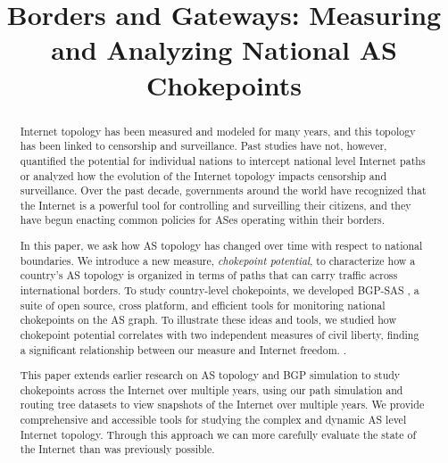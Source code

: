 \documentclass[10pt, conference, letterpaper]{IEEEtran}
\title{Borders and Gateways: Measuring and Analyzing National AS Chokepoints}
\newcommand{\toolname}{BGP-SAS }
\begin{document}
\maketitle

\begin{abstract}Internet topology has been measured and modeled for many years, and this topology has been linked to censorship and surveillance. Past studies have not, however, quantified the potential for individual nations to intercept national level Internet paths or analyzed how the evolution of the Internet topology impacts censorship and surveillance. Over the past decade, governments around the world have recognized that the Internet is a powerful tool for controlling and surveilling their citizens, and they have begun enacting common policies for ASes operating within their borders.

  In this paper, we ask how AS topology has changed over time with respect to national boundaries.  We introduce a new measure, \emph{chokepoint potential}, to characterize how a country's AS topology is organized in terms of paths that can carry traffic across international borders.  To study country-level chokepoints, we developed \toolname, a suite of open source, cross platform, and efficient tools for monitoring national chokepoints on the AS graph.  To illustrate these ideas and tools, we studied how chokepoint potential correlates with two independent measures of civil liberty, finding a significant relationship between our measure and Internet freedom. .

This paper extends earlier research on AS topology and BGP simulation to study chokepoints across the Internet over multiple years, using our
path simulation and routing tree datasets to view snapshots of the Internet
over multiple years. We provide comprehensive and accessible tools for studying
the complex and dynamic AS level Internet topology. Through this approach we
can more carefully evaluate the state of the Internet than was previously possible.
\end{abstract}
\end{document}
